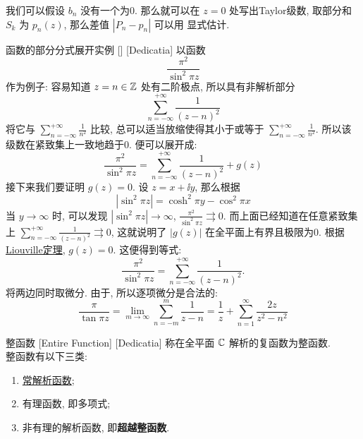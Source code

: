         \begin{prf}
            我们可以假设 \(b_n\) 没有一个为0. 那么就可以在 \(z=0\) 处写出Taylor级数, 取部分和 \(S_k\) 为 \(p_n(z)\), 那么差值 \(|P_n-p_n|\) 可以用\Taylor{} 显式估计. \\
            \continued
        \end{prf}

        \begin{xmp}
            {函数的部分分式展开实例}
            []
            [Dedicatia]
            以函数
            \[\frac{\pi^2}{\sin^2\pi z}\]
            作为例子: 容易知道 \(z=n\in\operatorname{\mathbb{Z}}\) 处有二阶极点, 所以具有非解析部分
            \[\sum_{n=-\infty}^{+\infty}\frac{1}{(z-n)^2}\]
            将它与 \(\sum\limits_{n=-\infty}^{+\infty}\frac{1}{n^2}\) 比较, 总可以适当放缩使得其小于或等于 \(\sum\limits_{n=-\infty}^{+\infty}\frac{1}{n^2}\). 所以该级数在紧致集上一致地趋于0. 便可以展开成: 
            \[\frac{\pi^2}{\sin^2\pi z}=\sum_{n=-\infty}^{+\infty}\frac{1}{(z-n)^2}+g(z)\]
            接下来我们要证明 \(g(z)=0\). 设 \(z=x+\ii y\), 那么根据
            \[|\sin^2\pi z|=\cosh^2\pi y-\cos^2\pi x\]
            当 \(y\to\infty\) 时, 可以发现 \(|\sin^2\pi z|\to\infty\),  \(\frac{\pi^2}{\sin^2\pi z}\rightrightarrows 0\). 而上面已经知道在任意紧致集上 \(\sum_{n=-\infty}^{+\infty}\frac{1}{(z-n)^2}\rightrightarrows 0\), 这就说明了 \(|g(z)|\) 在全平面上有界且极限为0. 根据\hyperref[thm:Liouville]{Liouville定理},  \(g(z)=0\). 这便得到等式: 
            \[\frac{\pi^2}{\sin^2\pi z}=\sum_{n=-\infty}^{+\infty}\frac{1}{(z-n)^2}.\]
            将两边同时取微分. 由于\UniformConvergent{}, 所以逐项微分是合法的: 
            \[\frac{\pi}{\tan\pi z}=\lim_{m\to\infty}\sum_{n=-m}^{m}\frac{1}{z-n}=\frac{1}{z}+\sum_{n=1}^{\infty}\frac{2z}{z^2-n^2}\]
        \end{xmp}

        \begin{dfn}
            {整函数}
            [Entire Function]
            [Dedicatia]
            称在全平面 \(\operatorname{\mathbb{C}}\) 解析的复函数为整函数. \\
            整函数有以下三类: 
            \begin{enumerate}
                \item \hyperref[ppt:Trivial-Analytical-Function]{常解析函数}; 
                \item 有理函数, 即多项式; 
                \item 非有理的解析函数, 即\textbf{超越整函数}.
            \end{enumerate}
        \end{dfn}

